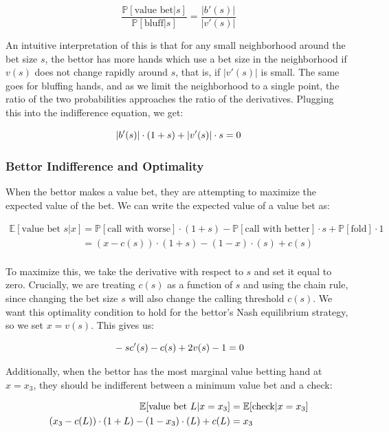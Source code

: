 \documentclass[a4paper,12pt]{article}
\theoremstyle{plain}
\theoremstyle{definition}
\begin{document}
\[ \frac{\mathbb{P}[\text{value bet} | s]}{\mathbb{P}[\text{bluff} | s]} = \frac{|b'(s)|}{|v'(s)|}\]

An intuitive interpretation of this is that for any small neighborhood around the bet size $s$, the bettor has more hands which use a bet size in the neighborhood if $v(s)$ does not change rapidly around $s$, that is, if $|v'(s)|$ is small. The same goes for bluffing hands, and as we limit the neighborhood to a single point, the ratio of the two probabilities approaches the ratio of the derivatives. Plugging this into the indifference equation, we get:

\begin{equation}{\label{callindiff}}
    |b'(s)| \cdot (1 + s) + |v'(s)| \cdot s = 0
\end{equation}

\subsubsection{Bettor Indifference and Optimality}

When the bettor makes a value bet, they are attempting to maximize the expected value of the bet. We can write the expected value of a value bet as:

\begin{align*}
    \mathbb{E}[\text{value bet } s | x] & = \mathbb{P}[\text{call with worse}] \cdot (1+s) - \mathbb{P}[\text{call with better}] \cdot s + \mathbb{P}[\text{fold}] \cdot 1 \\
    & = (x-c(s)) \cdot (1+s) - (1-x) \cdot (s) + c(s)\\
\end{align*}

To maximize this, we take the derivative with respect to $s$ and set it equal to zero. Crucially, we are treating $c(s)$ as a function of $s$ and using the chain rule, since changing the bet size $s$ will also change the calling threshold $c(s)$. We want this optimality condition to hold for the bettor's Nash equilibrium strategy, so we set $x=v(s)$. This gives us:

\begin{equation}{\label{valueoptimality}}
    -sc'(s) - c(s) + 2 v(s) - 1 = 0
\end{equation}

Additionally, when the bettor has the most marginal value betting hand at $x=x_3$, they should be indifferent between a minimum value bet and a check: 

\begin{align}{\label{valueindiff}}
    \nonumber \mathbb{E}[\text{value bet } L | x=x_3] & = \mathbb{E}[\text{check} | x=x_3]\\ 
    (x_3-c(L)) \cdot (1+L) - (1-x_3) \cdot (L) + c(L) & = x_3
\end{align}
\end{document}
